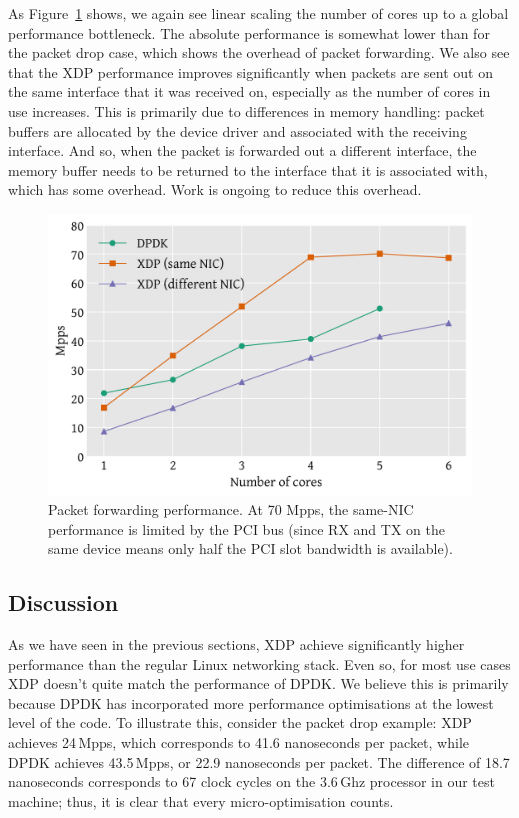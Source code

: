 \documentclass[10pt,sigconf,anonymous]{acmart}
\begin{document}
As Figure~\ref{fig:redirect-test} shows, we again see linear scaling the number
of cores up to a global performance bottleneck. The absolute performance is
somewhat lower than for the packet drop case, which shows the overhead of packet
forwarding. We also see that the XDP performance improves significantly when
packets are sent out on the same interface that it was received on, especially
as the number of cores in use increases. This is primarily due to differences in
memory handling: packet buffers are allocated by the device driver and
associated with the receiving interface. And so, when the packet is forwarded
out a different interface, the memory buffer needs to be returned to the
interface that it is associated with, which has some overhead. Work is ongoing
to reduce this overhead.

\begin{figure}[t]
\centering
\includegraphics[width=\linewidth]{figures/redirect-test.pdf}
\caption{\label{fig:redirect-test} Packet forwarding performance. At 70 Mpps,
  the same-NIC performance is limited by the PCI bus (since RX and TX on the
  same device means only half the PCI slot bandwidth is available).}
\end{figure}

\subsection{Discussion}
\label{sec:perf-discussion}

As we have seen in the previous sections, XDP achieve significantly higher
performance than the regular Linux networking stack. Even so, for most use cases
XDP doesn't quite match the performance of DPDK. We believe this is primarily
because DPDK has incorporated more performance optimisations at the lowest level
of the code. To illustrate this, consider the packet drop example: XDP achieves
24\,Mpps, which corresponds to 41.6 nanoseconds per packet, while DPDK achieves
43.5\,Mpps, or 22.9 nanoseconds per packet. The difference of 18.7 nanoseconds
corresponds to 67 clock cycles on the 3.6\,Ghz processor in our test machine;
thus, it is clear that every micro-optimisation counts.
\end{document}
